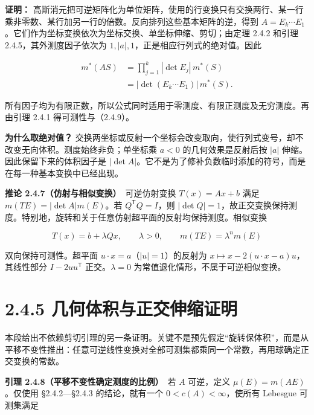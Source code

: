 \documentclass[11pt,a4paper]{article}
\begin{document}
\textbf{证明：}
高斯消元把可逆矩阵化为单位矩阵，使用的行变换只有交换两行、某一行乘非零数、某行加另一行的倍数。反向排列这些基本矩阵的逆，得到
\(A=E_k\cdots E_1\)。它们作为坐标变换依次为坐标交换、单坐标伸缩、剪切；由定理
2.4.2 和引理 2.4.5，其外测度因子依次为
\(1,|a|,1\)，正是相应行列式的绝对值。因此

\begin{equation*}
\begin{aligned}
m^*(AS)&=\prod_{j=1}^k|\det E_j|\,m^*(S)\\
&=|\det(E_k\cdots E_1)|\,m^*(S).
\end{aligned}
\tag{2.4.10}
\end{equation*}

所有因子均为有限正数，所以公式同时适用于零测度、有限正测度及无穷测度。再由引理
2.4.1 得可测性与（2.4.9）。

\textbf{为什么取绝对值？}
交换两坐标或反射一个坐标会改变取向，使行列式变号，却不改变无向体积。测度始终非负；单坐标乘
\(a<0\) 的几何效果是反射后按 \(|a|\) 伸缩。因此保留下来的体积因子是
\(|\det A|\)。它不是为了修补负数临时添加的符号，而是在每一种基本变换中已经出现。

\textbf{推论 2.4.7（仿射与相似变换）}　可逆仿射变换 \(T(x)=Ax+b\) 满足
\(m(TE)=|\det A|m(E)\)。若 \(Q^{\mathsf T}Q=I\)，则
\(|\det Q|=1\)，故正交变换保持测度。特别地，旋转和关于任意仿射超平面的反射均保持测度。相似变换

\begin{equation*}
T(x)=b+\lambda Qx,\qquad \lambda>0,
\qquad m(TE)=\lambda^n m(E)
\tag{2.4.11}
\end{equation*}

双向保持可测性。超平面 \(u\cdot x=a\)（\(|u|=1\)）的反射为
\(x\mapsto x-2(u\cdot x-a)u\)，其线性部分 \(I-2uu^{\mathsf T}\)
正交。\(\lambda=0\) 为常值退化情形，不属于可逆相似变换。

\section[\S{}2.4.5
几何体积与正交伸缩证明]{2.4.5
几何体积与正交伸缩证明}\label{ux51e0ux4f55ux4f53ux79efux4e0eux6b63ux4ea4ux4f38ux7f29ux8bc1ux660e}

本段给出不依赖剪切引理的另一条证明。关键不是预先假定``旋转保体积''，而是从平移不变性推出：任意可逆线性变换对全部可测集都乘同一个常数，再用球确定正交变换的常数。

\textbf{引理 2.4.8（平移不变性确定测度的比例）}　若 \(A\) 可逆，定义
\(\mu(E)=m(AE)\)。仅使用 §2.4.2---§2.4.3 的结论，就有一个
\(0<c(A)<\infty\)，使所有 Lebesgue 可测集满足
\end{document}
